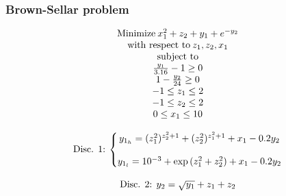 \documentclass[conf]{new-aiaa}
\begin{document}
\subsubsection{Brown-Sellar problem}
\begin{equation}
    \begin{matrix}
    \textnormal{Minimize} \: x_1^2+z_2+y_1+e^{-y_2} \\
    \textnormal{with respect to} \: z_1,z_2,x_1 \\
    \textnormal{subject to}  \\
    \frac{y_1}{3.16}-1\geq 0  \\
    1-\frac{y_2}{24}\geq 0 \\
    -1\leq z_1 \leq 2 \\
    -1\leq z_2 \leq 2 \\
    0\leq x_1 \leq 10 \\
    \\
    \textnormal{Disc. 1:} \: \left\{\begin{matrix} 
     y_{1_h}=(z_1^2)^{z_2^2+1}+(z_2^2)^{z_1^2+1}+x_1-0.2y_2 \\
    \\
    y_{1_l}=10^{-3}+\exp{(z_1^2+z_2^2)}+x_1-0.2y_2
    \end{matrix} \right. \\
    \\
    \textnormal{Disc. 2:} \:\: y_2=\sqrt{y_1}+z_1+z_2\\
    \end{matrix}
\end{equation}
\end{document}
